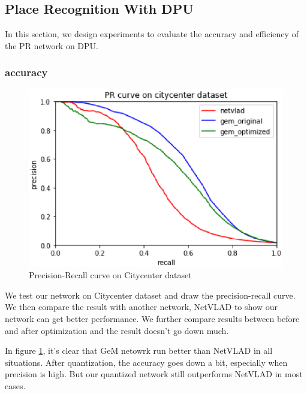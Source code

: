 


\subsection{ Place Recognition With DPU }

In this section, we design experiments to evaluate the accuracy and efficiency of the PR network on DPU.

\subsubsection{accuracy}

\begin{figure}[ht]
    \centering
    \includegraphics[width=1\linewidth]{fig/result.eps}
    \caption{Precision-Recall curve on Citycenter dataset}
    \label{fig:PRcurve}
\end{figure}

We test our network on Citycenter dataset \cite{citycenter} and draw the precision-recall curve. We then compare the result with another network, NetVLAD \cite{netvlad} to show our network can get better performance. We further compare results between before and after optimization and the result doesn't go down much.

In figure \ref{fig:PRcurve}, it's clear that GeM netowrk run better than NetVLAD in all situations. After quantization, the accuracy goes down a bit, especially when precision is high. But our quantized network still outperforms NetVLAD in most cases.


